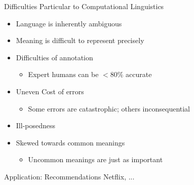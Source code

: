 \documentclass{beamer}
\begin{document}
\begin{frame}{Difficulties Particular to Computational Linguistics}

  \begin{itemize}
  \item Language is inherently ambiguous
  \item Meaning is difficult to represent precisely
  \item Difficulties of annotation
    \begin{itemize}
    \item Expert humans can be $< 80\%$ accurate
    \end{itemize}
  \item Uneven Cost of errors
    \begin{itemize}
    \item Some errors are catastrophic; others inconsequential
    \end{itemize}
  \item Ill-posedness
  \item Skewed towards common meanings
    \begin{itemize}
    \item Uncommon meanings are just as important
    \end{itemize}
  \end{itemize}

\end{frame}

\begin{frame}{Application: Recommendations}
  Netflix, ...
\end{frame}
\end{document}
